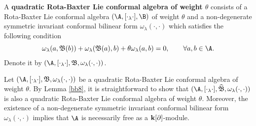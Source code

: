 \documentclass[12pt]{amsart}
\begin{document}
\begin{definition}
A {\bf quadratic   Rota-Baxter Lie conformal
algebra of weight  $\theta$} consists of a   Rota-Baxter Lie conformal
algebra $(\A,[\cdot_\lambda\cdot], \B)$  of weight  $\theta$ and a non-degenerate
symmetric invariant conformal bilinear form
$\omega_\lambda(\cdot,\cdot)$ which satisfies the following
condition
\begin{equation}\label{brblca}
    \omega_\lambda(a,\mathfrak{B}(b))+\omega_\lambda(\mathfrak{B}(a),b)+\theta\omega_\lambda(a,b)=0,\qquad \forall a,b\in \A.
\end{equation}
Denote it by $(\A,[\cdot_\lambda\cdot],\mathfrak{B},\omega_\lambda(\cdot,\cdot))$.
\end{definition}

\begin{remark}\label{rmk-1}
Let
$(\A,[\cdot_\lambda\cdot],\mathfrak{B},\omega_\lambda(\cdot,\cdot))$
be a quadratic   Rota-Baxter Lie conformal algebra of weight
$\theta$. By Lemma \ref{bb8}, it is straightforward to show that
$(\A,[\cdot_\lambda\cdot],\widehat{\mathfrak{B}},\omega_\lambda(\cdot,\cdot))$
is also a quadratic   Rota-Baxter Lie conformal algebra of weight
$\theta$. Moreover, the existence of a non-degenerate symmetric
invariant conformal bilinear form $\omega_\lambda(\cdot,\cdot)$
implies that $\A$ is necessarily free as a  ${\bf
k}[\partial]$-module.
\end{remark}
\end{document}
